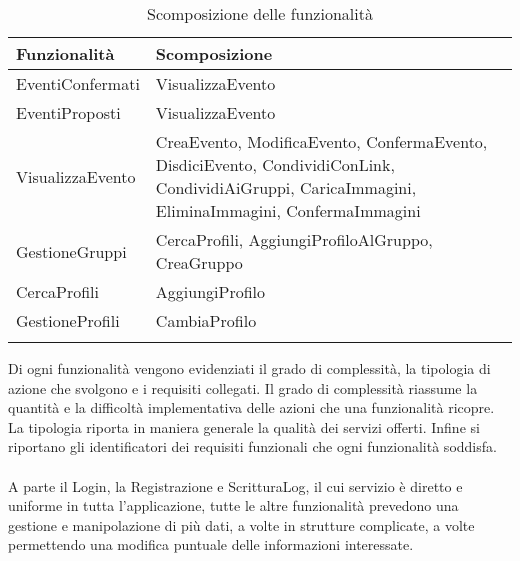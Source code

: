 \begin{longtable} {|P{7.3cm}|P{8cm}|}
        \hline
        \textbf{Funzionalità} & \textbf{Scomposizione}                                                                                                                            \\
        \hline
        \endhead
        EventiConfermati      & VisualizzaEvento                                                                                                                                  \\
        \hline
        EventiProposti        & VisualizzaEvento                                                                                                                                  \\
        \hline
        VisualizzaEvento      & CreaEvento, ModificaEvento, ConfermaEvento, DisdiciEvento, CondividiConLink, CondividiAiGruppi, CaricaImmagini, EliminaImmagini, ConfermaImmagini \\
        \hline
        GestioneGruppi        & CercaProfili, AggiungiProfiloAlGruppo, CreaGruppo                                                                                                 \\
        \hline
        CercaProfili          & AggiungiProfilo                                                                                                                                   \\
        \hline
        GestioneProfili       & CambiaProfilo                                                                                                                                     \\
        \hline
    \caption{Scomposizione delle funzionalità}

\end{longtable}

\clearpage

Di ogni funzionalità vengono evidenziati il grado di complessità, 
la tipologia di azione che svolgono e i requisiti collegati.
Il grado di complessità riassume la quantità e la difficoltà implementativa 
delle azioni che una funzionalità ricopre.
La tipologia riporta in maniera generale la qualità dei servizi offerti.
Infine si riportano gli identificatori dei requisiti funzionali che ogni funzionalità soddisfa.\\
\\
A parte il Login, la Registrazione e  ScritturaLog, 
il cui servizio è diretto e uniforme in tutta l'applicazione,
tutte le altre funzionalità prevedono una gestione e manipolazione di più dati,
a volte in strutture complicate, 
a volte permettendo una modifica puntuale delle informazioni interessate.



